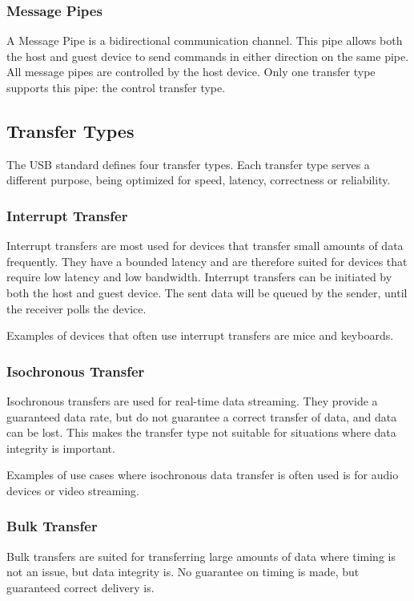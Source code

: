 \subsubsection{Message Pipes}
A Message Pipe is a bidirectional communication channel. This pipe allows both the host and guest device to send commands in either direction on the same pipe. All message pipes are controlled by the host device. Only one transfer type supports this pipe: the control transfer type.

\subsection{Transfer Types}
\label{section:transfer_types}
The USB standard defines four transfer types. Each transfer type serves a different purpose, being optimized for speed, latency, correctness or reliability.

\subsubsection{Interrupt Transfer}
Interrupt transfers are most used for devices that transfer small amounts of data frequently. They have a bounded latency and are therefore suited for devices that require low latency and low bandwidth. Interrupt transfers can be initiated by both the host and guest device. The sent data will be queued by the sender, until the receiver polls the device.

Examples of devices that often use interrupt transfers are mice and keyboards.

\subsubsection{Isochronous Transfer}
Isochronous transfers are used for real-time data streaming. They provide a guaranteed data rate, but do not guarantee a correct transfer of data, and data can be lost. This makes the transfer type not suitable for situations where data integrity is important.

Examples of use cases where isochronous data transfer is often used is for audio devices or video streaming.

\subsubsection{Bulk Transfer}
Bulk transfers are suited for transferring large amounts of data where timing is not an issue, but data integrity is. No guarantee on timing is made, but guaranteed correct delivery is.

